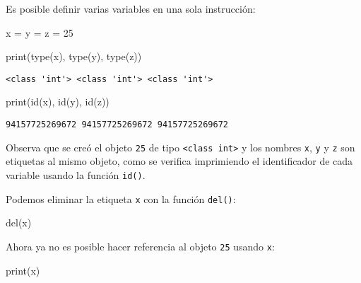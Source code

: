 \documentclass[
  letterpaper,
  DIV=11,
  numbers=noendperiod]{scrreprt}
\newenvironment{Shaded}{\begin{snugshade}}{\end{snugshade}}
\newcommand{\BuiltInTok}[1]{\textcolor[rgb]{0.00,0.23,0.31}{#1}}
\newcommand{\DecValTok}[1]{\textcolor[rgb]{0.68,0.00,0.00}{#1}}
\newcommand{\KeywordTok}[1]{\textcolor[rgb]{0.00,0.23,0.31}{#1}}
\newcommand{\NormalTok}[1]{\textcolor[rgb]{0.00,0.23,0.31}{#1}}
\newcommand{\OperatorTok}[1]{\textcolor[rgb]{0.37,0.37,0.37}{#1}}
\begin{document}
Es posible definir varias variables en una sola instrucción:

\begin{Shaded}
\begin{Highlighting}[]
\NormalTok{x }\OperatorTok{=}\NormalTok{ y }\OperatorTok{=}\NormalTok{ z }\OperatorTok{=} \DecValTok{25}
\end{Highlighting}
\end{Shaded}

\begin{Shaded}
\begin{Highlighting}[]
\BuiltInTok{print}\NormalTok{(}\BuiltInTok{type}\NormalTok{(x), }\BuiltInTok{type}\NormalTok{(y), }\BuiltInTok{type}\NormalTok{(z))}
\end{Highlighting}
\end{Shaded}

\begin{verbatim}
<class 'int'> <class 'int'> <class 'int'>
\end{verbatim}

\begin{Shaded}
\begin{Highlighting}[]
\BuiltInTok{print}\NormalTok{(}\BuiltInTok{id}\NormalTok{(x), }\BuiltInTok{id}\NormalTok{(y), }\BuiltInTok{id}\NormalTok{(z))}
\end{Highlighting}
\end{Shaded}

\begin{verbatim}
94157725269672 94157725269672 94157725269672
\end{verbatim}

Observa que se creó el objeto \texttt{25} de tipo
\texttt{\textless{}class\ \textquotesingle{}int\textquotesingle{}\textgreater{}}
y los nombres \texttt{x}, \texttt{y} y \texttt{z} son etiquetas al mismo
objeto, como se verifica imprimiendo el identificador de cada variable
usando la función \texttt{id()}.

Podemos eliminar la etiqueta \texttt{x} con la función \texttt{del()}:

\begin{Shaded}
\begin{Highlighting}[]
\KeywordTok{del}\NormalTok{(x)}
\end{Highlighting}
\end{Shaded}

Ahora ya no es posible hacer referencia al objeto \texttt{25} usando
\texttt{x}:

\begin{Shaded}
\begin{Highlighting}[]
\BuiltInTok{print}\NormalTok{(x)}
\end{Highlighting}
\end{Shaded}
\end{document}
